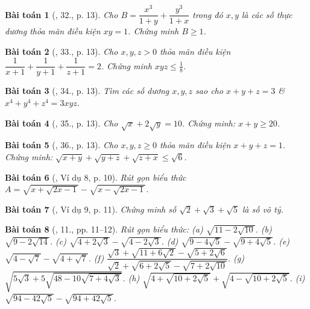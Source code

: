\documentclass{article}
\newtheorem{baitoan}{Bài toán}
\begin{document}
\begin{baitoan}[\cite{Tuyen_Toan_9}, 32., p. 13]
	Cho $B = \dfrac{x^3}{1 + y} + \dfrac{y^3}{1 + x}$ trong đó $x,y$ là các số thực dương thỏa mãn điều kiện $xy = 1$. Chứng minh $B\ge1$.
\end{baitoan}

\begin{baitoan}[\cite{Tuyen_Toan_9}, 33., p. 13]
	Cho $x,y,z > 0$ thỏa mãn điều kiện $\dfrac{1}{x + 1} + \dfrac{1}{y + 1} + \dfrac{1}{z + 1} = 2$. Chứng minh $xyz\le\frac{1}{8}$.
\end{baitoan}

\begin{baitoan}[\cite{Tuyen_Toan_9}, 34., p. 13]
	Tìm các số dương $x,y,z$ sao cho $x + y + z = 3$ \& $x^4 + y^4 + z^4 = 3xyz$.
\end{baitoan}

\begin{baitoan}[\cite{Tuyen_Toan_9}, 35., p. 13]
	Cho $\sqrt{x} + 2\sqrt{y} = 10$. Chứng minh: $x + y\ge20$.
\end{baitoan}

\begin{baitoan}[\cite{Tuyen_Toan_9}, 36., p. 13]
	Cho $x,y,z\ge0$ thỏa mãn điều kiện $x + y + z = 1$. Chứng minh: $\sqrt{x + y} + \sqrt{y + z} + \sqrt{z + x}\le\sqrt{6}$.
\end{baitoan}

\begin{baitoan}[\cite{Binh_Toan_9_tap_1}, Ví dụ 8, p. 10]
	Rút gọn biểu thức $A = \sqrt{x + \sqrt{2x - 1}} - \sqrt{ x - \sqrt{2x - 1}}$.
\end{baitoan}

\begin{baitoan}[\cite{Binh_Toan_9_tap_1}, Ví dụ 9, p. 11]
	Chứng minh số $\sqrt{2} + \sqrt{3} + \sqrt{5}$ là số vô tỷ.
\end{baitoan}

\begin{baitoan}[\cite{Binh_Toan_9_tap_1}, 11., pp. 11--12]
	Rút gọn biểu thức: (a) $\sqrt{11 - 2\sqrt{10}}$. (b) $\sqrt{9 - 2\sqrt{14}}$. (c) $\sqrt{4 + 2\sqrt{3}} - \sqrt{4 - 2\sqrt{3}}$. (d) $\sqrt{9 - 4\sqrt{5}} - \sqrt{9 + 4\sqrt{5}}$. (e) $\sqrt{4 - \sqrt{7}} - \sqrt{4 + \sqrt{7}}$. (f) $\dfrac{\sqrt{3} + \sqrt{11 + 6\sqrt{2}}- \sqrt{5 + 2\sqrt{6}}}{\sqrt{2} + \sqrt{6 + 2\sqrt{5}} - \sqrt{7 + 2\sqrt{10}}}$. (g) $\sqrt{5\sqrt{3} + 5\sqrt{48 - 10\sqrt{7+ 4\sqrt{3}}}}$. (h) $\sqrt{4 + \sqrt{10 + 2\sqrt{5}}} + \sqrt{4 - \sqrt{10 + 2\sqrt{5}}}$. (i) $\sqrt{94 - 42\sqrt{5}} - \sqrt{94 + 42\sqrt{5}}$.
\end{baitoan}
\end{document}

